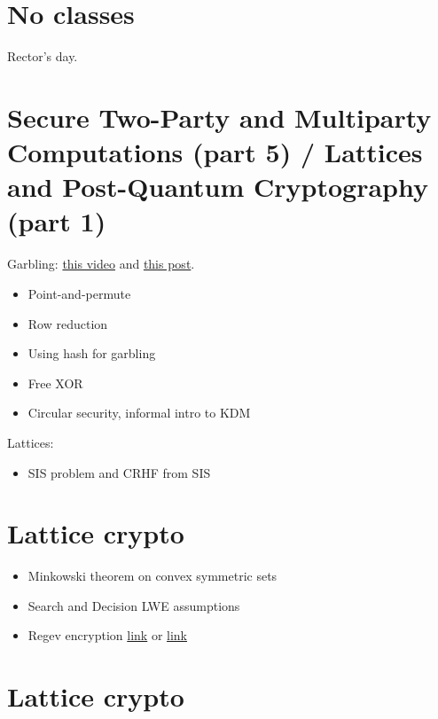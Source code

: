 \documentclass{llncs}
\begin{document}
\section{No classes}
Rector's day.

\section{Secure Two-Party and Multiparty Computations (part 5) / Lattices and Post-Quantum Cryptography (part 1)}
Garbling: \href{https://www.youtube.com/watch?v=FTxh908u9y8}{this video} and \href{https://blog.cryptographyengineering.com/2012/04/27/wonk-post-circular-security/}{this post}.
\begin{itemize}
	\item Point-and-permute
	\item Row reduction
	\item Using hash for garbling
	\item Free XOR
	\item Circular security, informal intro to KDM
\end{itemize}

Lattices:
\begin{itemize}
	\item SIS problem and CRHF from SIS
\end{itemize}

\section{Lattice crypto}
\begin{itemize}
	\item Minkowski theorem on convex symmetric sets
	\item Search and Decision LWE assumptions
	\item Regev encryption \href{https://www.youtube.com/watch?v=C_8_xsAwiyw}{link} or \href{https://perso.ens-lyon.fr/alain.passelegue/m2notes/class6.pdf}{link}
\end{itemize}

\section{Lattice crypto}


\printbibliography %
\end{document}

